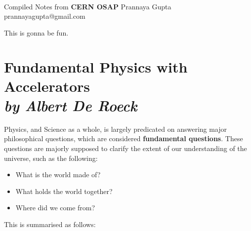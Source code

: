 \documentclass[11pt]{article}
\begin{document}
\thispagestyle{empty}
\bigskip \
\vspace{0.1cm}

\begin{center}
{\fontsize{22}{22} \selectfont Compiled Notes from}
\vskip 16pt
{\fontsize{36}{36} \selectfont \bf \sffamily CERN OSAP}
\vskip 24pt
{\fontsize{18}{18} \selectfont \rmfamily Prannaya Gupta} 
\vskip 6pt
{\fontsize{14}{14} \selectfont \ttfamily prannayagupta@gmail.com} 
\vskip 24pt
\end{center}

{\parindent0pt \baselineskip=15.5pt This is gonna be fun.}

\newpage
\microtoc
\newpage

\section{Fundamental Physics with Accelerators \\
\large{\it{by Albert De Roeck}}}

Physics, and Science as a whole, is largely predicated on answering major philosophical questions, which are considered \textbf{fundamental questions}. These questions are majorly supposed to clarify the extent of our understanding of the universe, such as the following:
\begin{itemize}
    \item What is the world made of?
    \item What holds the world together?
    \item Where did we come from?
\end{itemize}

This is summarised as follows:
\end{document}
